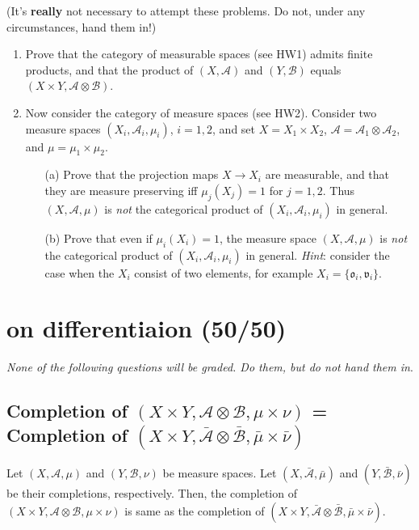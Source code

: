 \documentclass[lang=cn,11pt]{elegantbook}
\begin{document}
(It's \textbf{really} not necessary to attempt these problems. Do not, under any circumstances, hand them in!)
\begin{enumerate}
\item Prove that the category of measurable spaces (see HW1) admits finite products, and that the product of $(X,\mathcal{A})$ and $(Y,\mathcal{B})$ equals $(X\times Y,\mathcal{A}\otimes\mathcal{B})$. 
\item Now consider the category of measure spaces (see HW2). Consider two 
  measure spaces $(X_i,\mathcal{A}_i,\mu_i)$, $i=1,2$, and set $X=X_1\times X_2$, $\mathcal{A}=\mathcal{A}_1\otimes \mathcal{A}_2$, and $\mu=\mu_1\times\mu_2$.
  \begin{itemize}
  \item[(a)]Prove that the projection maps $X\to X_i$ are measurable, and that they are measure preserving iff $\mu_j(X_j)=1$ for $j=1,2$. Thus $(X,\mathcal{A},\mu)$ is \emph{not} the categorical product of $(X_i,\mathcal{A}_i,\mu_i)$ in general.
  \item[(b)]Prove that even if $\mu_i(X_i)=1$, the measure space $(X,\mathcal{A},\mu)$ is \emph{not} the categorical product of $(X_i,\mathcal{A}_i,\mu_i)$ in general.
    \textit{Hint}: consider the case when the $X_i$ consist of two elements, for example $X_i=\{\mathfrak{o}_i,\mathfrak{v}_i\}$.
  \end{itemize}
\end{enumerate}












\chapter{on differentiaion (50/50)}

\begin{center}
\textit{None of the following questions will be graded. Do them, but do not hand them in}.
\end{center}



\section{Completion of $(X\times Y, \mathcal{A}\otimes \mathcal{B}, \mu\times \nu)$ = Completion of $(X\times Y, \bar{\mathcal{A}}\otimes \bar{\mathcal{B}}, \bar{\mu}\times \bar{\nu})$}
Let $(X, \mathcal{A}, \mu)$ and $(Y, \mathcal{B}, \nu)$ be measure spaces. Let $(X, \bar{\mathcal{A}}, \bar{\mu})$ and $(Y, \bar{\mathcal{B}}, \bar{\nu})$ be their completions, respectively. 
Then, the completion of $(X\times Y, \mathcal{A}\otimes \mathcal{B}, \mu\times \nu)$ is same as the completion of $(X\times Y, \bar{\mathcal{A}}\otimes \bar{\mathcal{B}}, \bar{\mu}\times \bar{\nu})$.
\end{document}
